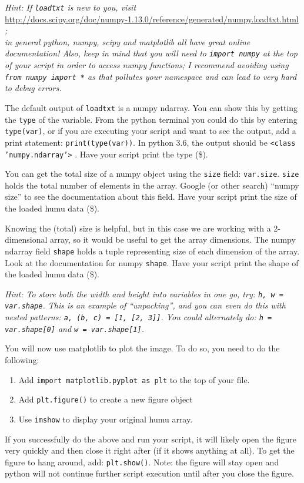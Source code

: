 \documentclass[10pt]{article}
\begin{document}
\begin{enumerate}
{\em Hint: If {\tt loadtxt} is new to you, visit} \\
\url{http://docs.scipy.org/doc/numpy-1.13.0/reference/generated/numpy.loadtxt.html} {\em ; \\ in general python, numpy, scipy and matplotlib all have great online documentation!  Also, keep in mind that you will need to {\tt import numpy} at the top of your script in order to access numpy functions; I recommend avoiding using {\tt from numpy import *} as that pollutes your namespace and can lead to very hard to debug errors. }

The default output of {\tt loadtxt} is a numpy ndarray.  You can show this by getting the {\tt type} of the variable.  From the python terminal you could do this by entering {\tt type(var)}, or if you are executing your script and want to see the output, add a print statement: {\tt print(type(var))}.  In python 3.6, the output should be {\tt <class 'numpy.ndarray'>} .  Have your script print the type (\$).

You can get the total size of a numpy object using the {\tt size} field: {\tt var.size}.  {\tt size} holds the total number of elements in the array.  Google (or other search) ``numpy size'' to see the documentation about this field.  Have your script print the size of the loaded humu data (\$).

Knowing the (total) size is helpful, but in this case we are working with a 2-dimensional array, so it would be useful to get the array dimensions.  The numpy ndarray field {\tt shape} holds a tuple representing size of each dimension of the array.  Look at the documentation for numpy {\tt shape}.  Have your script print the shape of the loaded humu data (\$).

{\em Hint: To store both the width and height into variables in one go, try: {\tt h, w = var.shape}.  This is an example of ``unpacking'', and you can even do this with nested patterns: {\tt a, (b, c) = [1, [2, 3]]}.  You could alternately do: {\tt h = var.shape[0]} and {\tt w = var.shape[1]}.}

You will now use matplotlib to plot the image.  To do so, you need to do the following:
\begin{enumerate}
\item Add {\tt import matplotlib.pyplot as plt} to the top of your file.
\item Add {\tt plt.figure()} to create a new figure object
\item Use {\tt imshow} to display your original humu array.
\end{enumerate}
If you successfully do the above and run your script, it will likely open the figure very quickly and then close it right after (if it shows anything at all).  To get the figure to hang around, add: {\tt plt.show()}.  Note: the figure will stay open and python will not continue further script execution until after you close the figure.


\end{enumerate}
\end{document}
